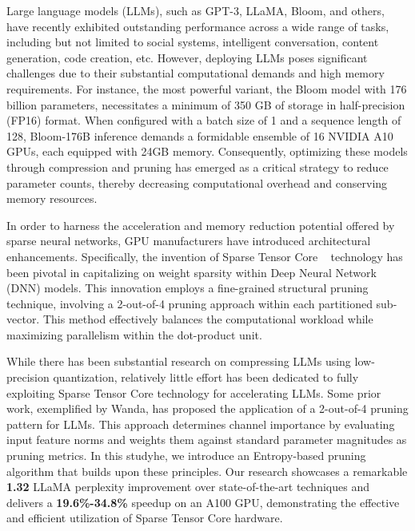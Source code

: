 Large language models (LLMs), such as GPT-3\cite{brown2020language}, LLaMA\cite{touvron2023llama}, Bloom\cite{scao2022bloom}, and others, have recently exhibited outstanding performance across a wide range of tasks, including but not limited to social systems, intelligent conversation, content generation, code creation, etc. However, deploying LLMs poses significant challenges due to their substantial computational demands and high memory requirements. For instance, the most powerful variant, the Bloom model with 176 billion parameters, necessitates a minimum of 350 GB of storage in half-precision (FP16) format. When configured with a batch size of 1 and a sequence length of 128, Bloom-176B inference demands a formidable ensemble of 16 NVIDIA A10 GPUs, each equipped with 24GB memory. Consequently, optimizing these models through compression and pruning has emerged as a critical strategy to reduce parameter counts, thereby decreasing computational overhead and conserving memory resources. %

In order to harness the acceleration and memory reduction potential offered by sparse neural networks, GPU manufacturers have introduced architectural enhancements. Specifically, the invention of Sparse Tensor Core ~\cite{a100, h100, yao2019balanced, cao2019efficient} technology has been pivotal in capitalizing on weight sparsity within Deep Neural Network (DNN) models. This innovation employs a fine-grained structural pruning technique, involving a 2-out-of-4 pruning approach within each partitioned sub-vector. This method effectively balances the computational workload while maximizing parallelism within the dot-product unit.

While there has been substantial research on compressing LLMs using low-precision quantization\cite{xiao2023smoothquant, dettmers2022llm, frantar2022gptq}, relatively little effort has been dedicated to fully exploiting Sparse Tensor Core technology for accelerating LLMs. Some prior work, exemplified by Wanda\cite{sun2023simple}, has proposed the application of a 2-out-of-4 pruning pattern for LLMs. This approach determines channel importance by evaluating input feature norms and weights them against standard parameter magnitudes as pruning metrics. In this studyhe, we introduce an Entropy-based pruning algorithm that builds upon these principles. Our research showcases a remarkable \textbf{1.32} LLaMA perplexity improvement over state-of-the-art techniques and delivers a \textbf{19.6\%-34.8\%} speedup on an A100 GPU, demonstrating the effective and efficient utilization of Sparse Tensor Core hardware.


